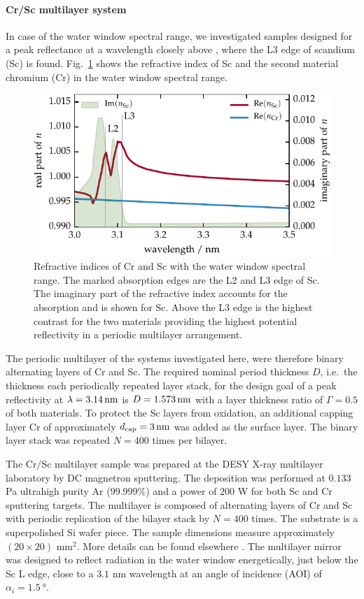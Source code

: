 \paragraph{Cr/Sc multilayer system}
In case of the water window spectral range, we investigated samples designed for a peak reflectance at a wavelength closely above , where the L3 edge of scandium (Sc) is found. Fig.~\ref{ch_exp:fig_crsc_contrast} shows the refractive index of Sc and the second material chromium (Cr) in the water window spectral range. 
\begin{figure}[htb]
        \includegraphics{img/Cr_Sc_contrast}
        \caption[Refractive indices of Cr and Sc in the water window.]{%
            Refractive indices of Cr and Sc with the water window spectral range. The marked absorption edges are the L2 and L3 edge of Sc. The imaginary part of the refractive index accounts for the absorption and is shown for Sc. Above the L3 edge is the highest contrast for the two materials providing the highest potential reflectivity in a periodic multilayer arrangement.}
        \label{ch_exp:fig_crsc_contrast}
\end{figure}
The periodic multilayer of the systems investigated here, were therefore binary alternating layers of Cr and Sc. The required nominal period thickness $D$, i.e.~the thickness each periodically repeated layer stack, for the design goal of a peak reflectivity at $\lambda=\nm{3.14}$ is $D=\nm{1.573}$ with a layer thickness ratio of $\Gamma=0.5$ of both materials. To protect the Sc layers from oxidation, an additional capping layer Cr of approximately $d_\text{cap} = \nm{3}$ was added as the surface layer. The binary layer stack was repeated $N=400$ times per bilayer.

The Cr/Sc multilayer sample was prepared at the DESY X-ray multilayer 
laboratory by DC magnetron sputtering. The deposition was performed at $0.133$ 
Pa ultrahigh purity Ar ($99.999\%$) and a power of $200$ W for both Sc and Cr 
sputtering targets. The multilayer is composed of alternating layers of Cr and 
Sc with periodic replication of the bilayer stack by $N=400$ times. The 
substrate is a superpolished Si wafer piece. The sample dimensions measure 
approximately $(20 \times 20)$ mm$^2$. More details can be found elsewhere 
\cite{prasciolu_thermal_2014}. The multilayer mirror was designed to reflect 
radiation in the water window energetically, just below the Sc L edge, close to 
a $3.1$ nm wavelength at an angle of incidence (AOI) of $\alpha_i = 
\SI{1.5}{\degree}$.



